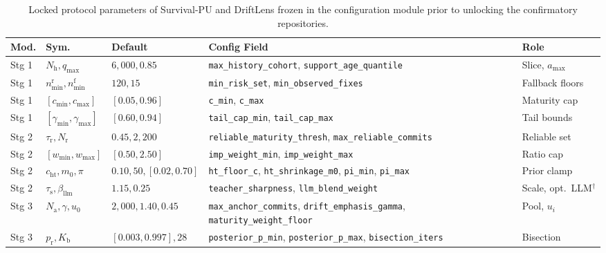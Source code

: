 \documentclass[pdflatex,sn-basic]{sn-jnl}
\renewcommand{\arraystretch}{1.06}
\theoremstyle{definition}
\theoremstyle{plain}
\begin{document}
\begin{appendices}
\begin{table}[t]
\centering
\caption{Locked protocol parameters of Survival-PU and DriftLens frozen in the configuration module prior to unlocking the confirmatory repositories.}
\label{tab:hyperparams}
\fontsize{7.5}{9.0}\selectfont
\renewcommand{\arraystretch}{1.03}
\setlength{\tabcolsep}{1.2pt}
\begin{tabularx}{\textwidth}{lllL{3.70cm}Y}
\toprule
\textbf{Mod.} & \textbf{Sym.} & \textbf{Default} & \textbf{Config Field} & \textbf{Role} \\
\midrule
Stg 1 & $N_{\text{h}}, q_{\max}$ & $6{,}000, 0.85$ & \texttt{max\_\allowbreak history\_\allowbreak cohort}, \texttt{support\_\allowbreak age\_\allowbreak quantile} & Slice, $a_{\max}$ \\
Stg 1 & $n_{\min}^{\text{r}}, n_{\min}^{\text{f}}$ & $120, 15$ & \texttt{min\_\allowbreak risk\_\allowbreak set}, \texttt{min\_\allowbreak observed\_\allowbreak fixes} & Fallback floors \\
Stg 1 & $[c_{\min}, c_{\max}]$ & $[0.05, 0.96]$ & \texttt{c\_min}, \texttt{c\_max} & Maturity cap \\
Stg 1 & $[\gamma_{\min}, \gamma_{\max}]$ & $[0.60, 0.94]$ & \texttt{tail\_\allowbreak cap\_\allowbreak min}, \texttt{tail\_\allowbreak cap\_\allowbreak max} & Tail bounds \\
Stg 2 & $\tau_{\text{r}}, N_{\text{r}}$ & $0.45, 2{,}200$ & \texttt{reliable\_\allowbreak maturity\_\allowbreak thresh}, \texttt{max\_\allowbreak reliable\_\allowbreak commits} & Reliable set \\
Stg 2 & $[w_{\min}, w_{\max}]$ & $[0.50, 2.50]$ & \texttt{imp\_\allowbreak weight\_\allowbreak min}, \texttt{imp\_\allowbreak weight\_\allowbreak max} & Ratio cap \\
Stg 2 & $c_{\text{ht}}, m_0, \pi$ & $0.10, 50, [0.02, 0.70]$ & \texttt{ht\_\allowbreak floor\_\allowbreak c}, \texttt{ht\_\allowbreak shrinkage\_\allowbreak m0}, \texttt{pi\_min}, \texttt{pi\_max} & Prior clamp \\
Stg 2 & $\tau_{\text{s}}, \beta_{\text{llm}}$ & $1.15, 0.25$ & \texttt{teacher\_\allowbreak sharpness}, \texttt{llm\_\allowbreak blend\_\allowbreak weight} & Scale, opt.\ LLM$^\dagger$ \\
Stg 3 & $N_{\text{a}}, \gamma, u_0$ & $2{,}000, 1.40, 0.45$ & \texttt{max\_\allowbreak anchor\_\allowbreak commits}, \texttt{drift\_\allowbreak emphasis\_\allowbreak gamma}, \texttt{maturity\_\allowbreak weight\_\allowbreak floor} & Pool, $u_i$ \\
Stg 3 & $p_{\text{r}}, K_{\text{b}}$ & $[0.003, 0.997], 28$ & \texttt{posterior\_\allowbreak p\_\allowbreak min}, \texttt{posterior\_\allowbreak p\_\allowbreak max}, \texttt{bisection\_\allowbreak iters} & Bisection \\

\end{tabularx}
\end{table}
\end{appendices}
\end{document}
